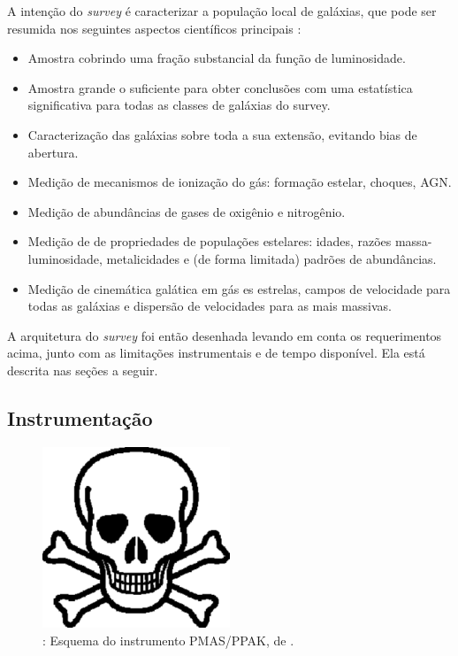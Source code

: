 A intenção do {\em survey} é caracterizar a população local de galáxias, que
pode ser resumida nos seguintes aspectos científicos principais
\citep{Sanchez2012}:
\begin{itemize}
  \item Amostra cobrindo uma fração substancial da função de luminosidade.
  \item Amostra grande o suficiente para obter conclusões com uma estatística
  significativa para todas as classes de galáxias do survey.
  \item Caracterização das galáxias sobre toda a sua extensão, evitando bias de
  abertura.
  \item Medição de mecanismos de ionização do gás: formação estelar, choques,
  AGN.
  \item Medição de abundâncias de gases de oxigênio e nitrogênio.
  \item Medição de de propriedades de populações estelares: idades, razões
  massa-luminosidade, metalicidades e (de forma limitada) padrões de
  abundâncias.
  \item Medição de cinemática galática em gás es estrelas, campos de velocidade
  para todas as galáxias e dispersão de velocidades para as mais massivas.
\end{itemize}
A arquitetura do {\em survey} foi então desenhada levando em conta os
requerimentos acima, junto com as limitações instrumentais e de tempo
disponível. Ela está descrita nas seções a seguir.

\subsection{Instrumentação}
\label{sec:ifs:instrumentacao}

\begin{figure}
	\includegraphics[width=0.5\textwidth]{figuras/test.pdf}
	\caption[Esquema do instrumento PMAS/PPAK.]
	{\TODO: Esquema do instrumento PMAS/PPAK, de \citet{Kelz2006}.}
	\label{fig:PPAK}
\end{figure}

